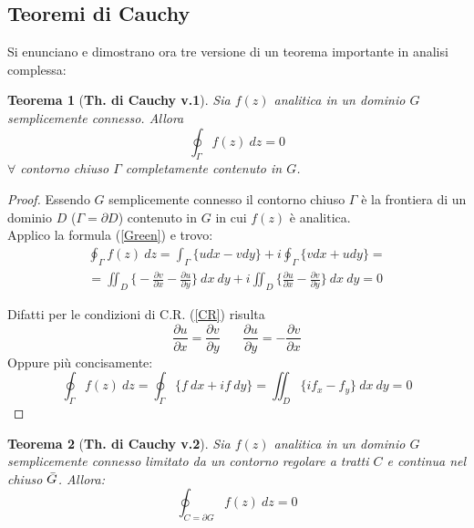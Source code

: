 \documentclass[twoside]{article}
\newtheorem{theorem}{Teorema}[section]
\begin{document}
\subsection{Teoremi di Cauchy}
Si enunciano e dimostrano ora tre versione di un teorema importante in analisi complessa:
\begin{theorem}[\textbf{Th. di Cauchy v.1}] \label{Cauchy}
Sia $f(z)$ analitica in un dominio $G$ semplicemente connesso. Allora
\begin{equation}
    \oint_{\Gamma} f(z) \ dz=0
\end{equation}
$\forall$ contorno chiuso $\Gamma$ completamente contenuto in $G$.
\end{theorem}

\begin{proof}
Essendo $G$ semplicemente connesso il contorno chiuso $\Gamma$ è la frontiera di un dominio $D$ ($\Gamma=\partial D$) contenuto in $G$ in cui $f(z)$ è analitica.
\\
Applico la formula (\ref{Green}) e trovo:
\begin{equation} \begin{split}
    \oint_{\Gamma} f(z) \ dz = \int_{\Gamma} \{u dx - v dy \} + i\oint_{\Gamma} \{v dx + u dy \} = \\
    =\iint_D \biggl\{ - \frac{\partial v}{\partial x} - \frac{\partial u}{\partial y} \biggr\} \ dx \ dy + i \iint_D \biggl\{ \frac{\partial u}{\partial x} - \frac{\partial v}{\partial y} \biggr\} \ dx \ dy =0
\end{split}\end{equation}

Difatti per le condizioni di C.R. (\ref{CR}) risulta
\begin{equation}
    \frac{\partial u}{\partial x}=\frac{\partial v}{\partial y} \ \ \ \ \ \ \ \ \frac{\partial u}{\partial y}=-\frac{\partial v}{\partial x}
\end{equation}
Oppure più concisamente:
\begin{equation}
    \oint_{\Gamma}f(z) \ dz = \oint_{\Gamma} \{ f \ dx + if \ dy \}= \iint_D \{if_x -f_y\}\ dx \ dy=0
\end{equation}
\end{proof}

\begin{theorem}[\textbf{Th. di Cauchy v.2}] \label{Cauchy 2}
Sia $f(z)$ analitica in un dominio $G$ semplicemente connesso limitato da un contorno regolare a tratti $C$ e continua nel chiuso $\Bar{G}$. Allora:
\begin{equation}
    \oint_{C=\partial G}f(z) \ dz=0
\end{equation}
\end{theorem}
\end{document}
